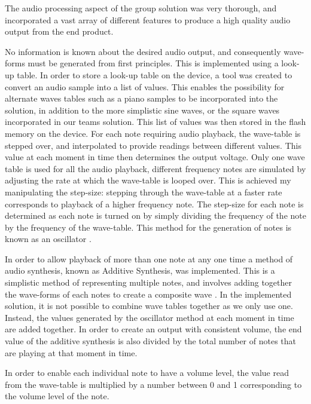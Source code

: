 The audio processing aspect of the group solution was very thorough, and 
incorporated a vast array of different features to produce a high quality audio
output from the end product.
\par\bigskip\noindent
No information is known about the desired audio output, and consequently 
wave-forms must be generated from first principles. 
This is implemented using a look-up table. 
In order to store a look-up table on the device, a tool was created to convert 
an audio sample into a list of values.
This enables the possibility for alternate waves tables such as a piano samples 
to be incorporated into the solution, in addition to the more simplistic sine 
waves, or the square waves incorporated in our teams solution.
This list of values was then stored in the flash memory on the device.
For each note requiring audio playback, the wave-table is stepped over, and 
interpolated to provide readings between different values. 
This value at each moment in time then determines the output voltage. 
Only one wave table is used for all the audio playback, different frequency notes are 
simulated by adjusting the rate at which the wave-table is looped over. This is 
achieved my manipulating the step-size: stepping through the wave-table at a 
faster rate corresponds to playback of a higher frequency note. The step-size 
for each note is determined as each note is turned on by simply dividing the 
frequency of the note by the frequency of the wave-table. This method for the 
generation of notes is known as an oscillator \cite{puckette2007theory}.
\par\bigskip\noindent
In order to allow playback of more than one note at any one time a method of 
audio synthesis, known as Additive Synthesis, was implemented. This is a simplistic
method of representing multiple notes, and involves adding together the 
wave-forms of each notes to create a composite wave \cite{miranda2012computer}. 
In the implemented solution, it is not possible to combine wave tables 
together as we only use one. Instead, the values generated by the oscillator 
method at each moment in time are added together. 
In order to create an output with consistent volume, the end value of the 
additive synthesis is also divided by the total number of notes that are playing 
at that moment in time. 
\par\bigskip\noindent
In order to enable each individual note to have a volume level, the 
value read from the wave-table is multiplied by a number between 0 and 1 
corresponding to the volume level of the note. 
